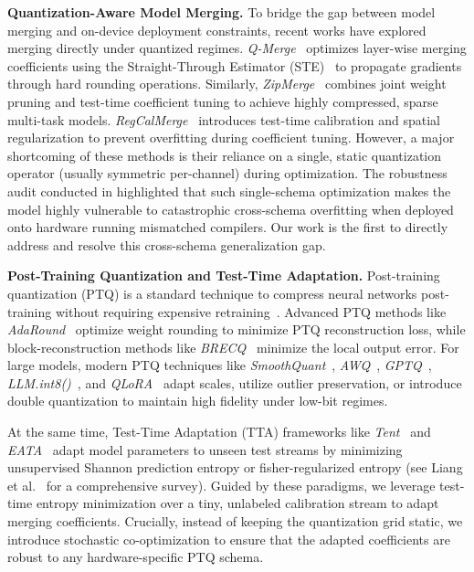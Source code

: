\textbf{Quantization-Aware Model Merging.}
To bridge the gap between model merging and on-device deployment constraints, recent works have explored merging directly under quantized regimes. \emph{Q-Merge}~\cite{qmerge} optimizes layer-wise merging coefficients using the Straight-Through Estimator (STE)~\cite{bengio13ste} to propagate gradients through hard rounding operations. Similarly, \emph{ZipMerge}~\cite{zipmerge} combines joint weight pruning and test-time coefficient tuning to achieve highly compressed, sparse multi-task models. \emph{RegCalMerge}~\cite{regcalmerge} introduces test-time calibration and spatial regularization to prevent overfitting during coefficient tuning. However, a major shortcoming of these methods is their reliance on a single, static quantization operator (usually symmetric per-channel) during optimization. The robustness audit conducted in \cite{qmergeaudit} highlighted that such single-schema optimization makes the model highly vulnerable to catastrophic cross-schema overfitting when deployed onto hardware running mismatched compilers. Our work is the first to directly address and resolve this cross-schema generalization gap.

\textbf{Post-Training Quantization and Test-Time Adaptation.}
Post-training quantization (PTQ) is a standard technique to compress neural networks post-training without requiring expensive retraining~\cite{jacob18quant, gholami21survey, nagel19datafree}. Advanced PTQ methods like \emph{AdaRound}~\cite{nagel20adaround} optimize weight rounding to minimize PTQ reconstruction loss, while block-reconstruction methods like \emph{BRECQ}~\cite{li2021brecq} minimize the local output error. For large models, modern PTQ techniques like \emph{SmoothQuant}~\cite{pmlr-v202-xiao23c}, \emph{AWQ}~\cite{lin2024awq}, \emph{GPTQ}~\cite{frantar2023gptq}, \emph{LLM.int8()}~\cite{dettmers2022llmint8}, and \emph{QLoRA}~\cite{dettmers2023qlora} adapt scales, utilize outlier preservation, or introduce double quantization to maintain high fidelity under low-bit regimes. 

At the same time, Test-Time Adaptation (TTA) frameworks like \emph{Tent}~\cite{wang20tta} and \emph{EATA}~\cite{niu2022eata} adapt model parameters to unseen test streams by minimizing unsupervised Shannon prediction entropy or fisher-regularized entropy (see Liang et al.~\cite{liang2023comprehensive} for a comprehensive survey). Guided by these paradigms, we leverage test-time entropy minimization over a tiny, unlabeled calibration stream to adapt merging coefficients. Crucially, instead of keeping the quantization grid static, we introduce stochastic co-optimization to ensure that the adapted coefficients are robust to any hardware-specific PTQ schema.
